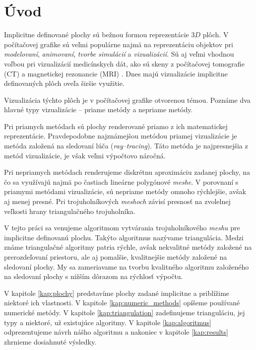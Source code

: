 \chapter*{Úvod} %

Implicitne definované plochy sú bežnou formou reprezentácie $3D$ plôch. V počítačovej grafike 
sú veľmi populárne najmä na reprezentáciu objektov pri \textit{modelovaní}, \textit{animovaní}, 
\textit{tvorbe simulácií} a \textit{vizualizácií}. Sú aj veľmi vhodnou
voľbou pri vizualizácií medicínskych dát, ako sú skeny z počítačovej tomografie (CT) a magnetickej
rezonancie (MRI) \cite{de2015survey}.
Dnes majú vizualizácie implicitne definovaných plôch oveľa širšie využitie.

Vizualizácia týchto plôch je v počítačovej grafike otvorenou témou. Poznáme 
dva hlavné typy vizualizácie -- priame metódy a nepriame metódy. 

Pri priamych metódach sú plochy renderované priamo z ich 
matematickej reprezentácie. Pravdepodobne najznámejšou metódou priamej vizualizácie je 
metóda založená na sledovaní lúča (\textit{ray--tracing}). Táto metóda je najpresnejšia z metód vizualizácie,
je však veľmi výpočtovo náročná.

Pri nepriamych metódach renderujeme diskrétnu aproximáciu zadanej plochy, 
na čo sa využívajú najmä po častiach lineárne polygónové \textit{meshe}. 
V porovnaní s priamymi metódami 
vizualizácie, sú nepriame metódy omnoho rýchlejšie, avšak aj menej presné. Pri trojuholníkových 
\textit{meshoch} závisí presnosť na zvolelnej veľkosti hrany triangulačného trojuholníka. 

V tejto práci sa venujeme algoritmom vytvárania trojuholníkového \textit{meshu} pre 
implicitne definovanú plochu. Takýto algoritmus nazývame triangulácia. Medzi známe triangulačné 
algoritmy patria rýchle, avšak nekvalitné metódy založené na prerozdeľovaní priestoru, 
ale aj pomalšie, kvalitnejšie metódy založené na sledovaní plochy.
My sa zameriavame na tvorbu kvalitného algoritmu založeného na sledovaní plochy
s nižším dôrazom na rýchlosť výpočtu.

V kapitole \ref{kap:plochy} predstavíme plochy zadané implicitne a priblížime niektoré ich vlastnosti.
V kapitole \ref{kap:numeric_methods} opíšeme používané numerické metódy.
V kapitole \ref{kap:triangulation} zadefinujeme trianguláciu, jej typy a niektoré, už existujúce algoritmy.
V kapitole \ref{kap:algoritmus} odprezentujeme návrh nášho algoritmu a nakoniec v 
kapitole \ref{kap:results} zhrnieme dosiahnuté výsledky. 


